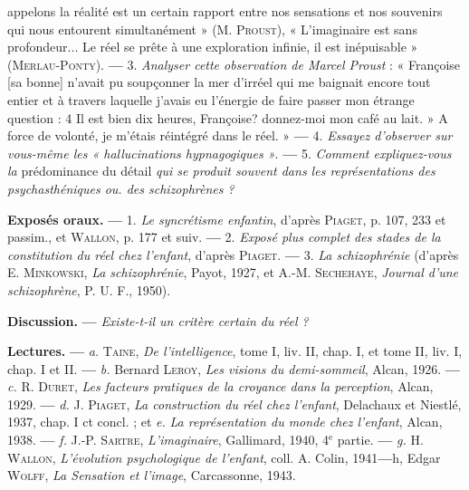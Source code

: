 {appelons la réalité est un certain rapport entre nos sensations et nos souvenirs
qui nous entourent simultanément » (M. \textsc{Proust}), « L’imaginaire
est sans profondeur... Le réel se prête à une exploration infinie, il est inépuisable »
(\textsc{Merlau-Ponty}). {\bf —} 3. {\it Analyser cette observation de Marcel
Proust} : « Françoise [sa bonne] n’avait pu soupçonner la mer d’irréel qui me
baignait encore tout entier et à travers laquelle j'avais eu l’énergie de faire
passer mon étrange question : 4 Il est bien dix heures, Françoise? donnez-moi
mon café au lait. » A force de volonté, je m'étais réintégré dans le réel. »
{\bf —} 4. {\it Essayez d'observer sur vous-même les « hallucinations hypnagogiques »}.
{\bf —} 5. {\it Comment expliquez-vous la} prédominance du détail {\it qui se produit
souvent dans les représentations des psychasthéniques ou. des schizophrènes ?}

{\bf Exposés oraux.} {\bf —} 1. {\it Le syncrétisme enfantin}, d'après \textsc{Piaget}, p. 107,
233 et passim., et \textsc{Wallon}, p. 177 et suiv. {\bf —} 2. {\it Exposé plus complet des
stades de la constitution du réel chez l'enfant}, d'après \textsc{Piaget}. {\bf —} 3. {\it La
schizophrénie} (d’après E. \textsc{Minkowski}, {\it La schizophrénie}, Payot, 1927, et
A.-M. \textsc{Sechehaye}, {\it Journal d'une schizophrène}, P. U. F., 1950).

{\bf Discussion.} {\bf —} {\it Existe-t-il un critère certain du réel ?}

{\bf Lectures.} {\bf —} {\it a.} \textsc{Taine}, {\it De l'intelligence}, tome I, liv. II, chap. I, et tome II,
liv. I, chap. I et II. {\bf —} {\it b.} Bernard \textsc{Leroy}, {\it Les visions du demi-sommeil},
Alcan, 1926. {\bf —} {\it c.} R. \textsc{Duret}, {\it Les facteurs pratiques de la croyance dans la
perception}, Alcan, 1929. {\bf —} {\it d.} J. \textsc{Piaget}, {\it La construction du réel chez l'enfant},
Delachaux et Niestlé, 1937, chap. I ct concl. ; et {\it e.} {\it La représentation du
monde chez l'enfant}, Alcan, 1938. {\bf —} {\it f.} J.-P. \textsc{Sartre}, {\it L'imaginaire}, Gallimard,
1940, 4$^\text{e}$ partie. {\bf —} {\it g.} H. \textsc{Wallon}, {\it L'évolution psychologique de
l'enfant}, coll. A. Colin, 1941{\bf —}h, Edgar \textsc{Wolff}, {\it La Sensation et l'image},
Carcassonne, 1943.}
\vspace{0.31cm}
